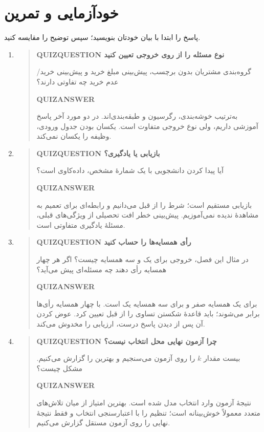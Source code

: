\section{خودآزمایی و تمرین}
پاسخ را ابتدا با بیان خودتان بنویسید؛ سپس توضیح را مقایسه کنید.
\begin{enumerate}
\item\begin{quote}\textbf{QUIZQUESTION نوع مسئله را از روی خروجی تعیین کنید}\par 
گروه‌بندی مشتریان بدون برچسب، پیش‌بینی مبلغ خرید و پیش‌بینی خرید/عدم خرید چه تفاوتی دارند؟
\par\textbf{QUIZANSWER}\par به‌ترتیب خوشه‌بندی، رگرسیون و طبقه‌بندی‌اند. در دو مورد آخر پاسخ آموزشی داریم، ولی نوع خروجی متفاوت است. یکسان بودن جدول ورودی، وظیفه را یکسان نمی‌کند.\par 
\end{quote}
\item\begin{quote}\textbf{QUIZQUESTION بازیابی یا یادگیری؟}\par 
آیا پیدا کردن دانشجویی با یک شمارهٔ مشخص، داده‌کاوی است؟
\par\textbf{QUIZANSWER}\par بازیابی مستقیم است؛ شرط را از قبل می‌دانیم و رابطه‌ای برای تعمیم به مشاهدهٔ ندیده نمی‌آموزیم. پیش‌بینی خطر افت تحصیلی از ویژگی‌های قبلی، مسئلهٔ یادگیری متفاوتی است.\par 
\end{quote}
\item\begin{quote}\textbf{QUIZQUESTION رأی همسایه‌ها را حساب کنید}\par 
در مثال این فصل، خروجی برای یک و سه همسایه چیست؟ اگر هر چهار همسایه رأی دهند چه مسئله‌ای پیش می‌آید؟
\par\textbf{QUIZANSWER}\par برای یک همسایه صفر و برای سه همسایه یک است. با چهار همسایه رأی‌ها برابر می‌شوند؛ باید قاعدهٔ شکستن تساوی را از قبل تعیین کرد. عوض کردن آن پس از دیدن پاسخ درست، ارزیابی را مخدوش می‌کند.\par 
\end{quote}
\item\begin{quote}\textbf{QUIZQUESTION چرا آزمون نهایی محل انتخاب نیست؟}\par 
بیست مقدار $k$ را روی آزمون می‌سنجیم و بهترین را گزارش می‌کنیم. مشکل چیست؟
\par\textbf{QUIZANSWER}\par نتیجهٔ آزمون وارد انتخاب مدل شده است. بهترین امتیاز از میان تلاش‌های متعدد معمولاً خوش‌بینانه است؛ تنظیم را با اعتبارسنجی انتخاب و فقط نتیجهٔ نهایی را روی آزمون مستقل گزارش می‌کنیم.\par 

\end{quote}
\end{enumerate}
